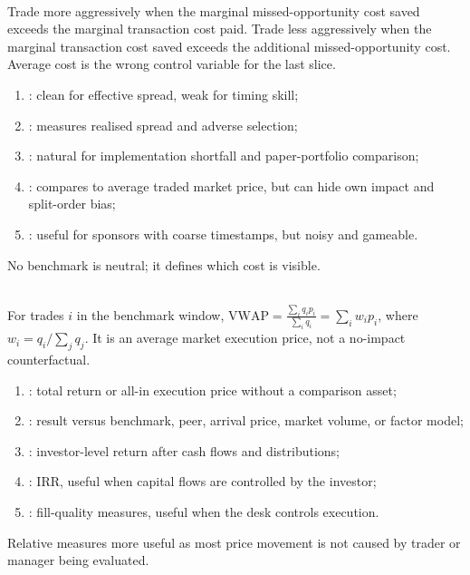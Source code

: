 \begin{principle} \\
Trade more aggressively when the marginal missed-opportunity cost saved exceeds the marginal transaction cost paid. Trade less aggressively when the marginal transaction cost saved exceeds the additional missed-opportunity cost. Average cost is the wrong control variable for the last slice.
\end{principle}

\begin{taxonomy} 
\begin{enumerate}[label=\roman*.]
\setlength{\itemsep}{0pt}
\item {}: clean for effective spread, weak for timing skill;
\item {}: measures realised spread and adverse selection;
\item {}: natural for implementation shortfall and paper-portfolio comparison;
\item {}: compares to average traded market price, but can hide own impact and split-order bias;
\item {}: useful for sponsors with coarse timestamps, but noisy and gameable.
\end{enumerate}
No benchmark is neutral; it defines which cost is visible.
\end{taxonomy}

\begin{definition} \\
For trades $i$ in the benchmark window, $\mathrm{VWAP}=\frac{\sum_i q_i p_i}{\sum_i q_i}=\sum_i w_i p_i$, where $w_i=q_i/\sum_j q_j$. It is an average market execution price, not a no-impact counterfactual.
\end{definition}

\begin{taxonomy} 
\begin{enumerate}[label=\roman*.]
\setlength{\itemsep}{0pt}
\item {}: total return or all-in execution price without a comparison asset;
\item {}: result versus benchmark, peer, arrival price, market volume, or factor model;
\item {}: investor-level return after cash flows and distributions;
\item {}: IRR, useful when capital flows are controlled by the investor;
\item {}: fill-quality measures, useful when the desk controls execution.
\end{enumerate}
Relative measures more useful as most price movement is not caused by trader or manager being evaluated.
\end{taxonomy}

